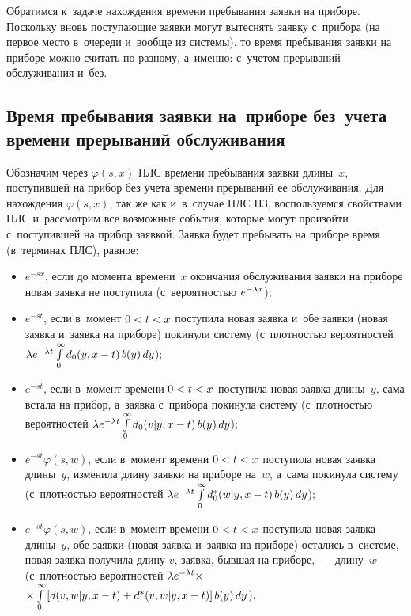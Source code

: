 \begin{multicols}{2}
Обратимся к~задаче нахождения времени пребывания заявки на приборе.
Поскольку вновь поступающие заявки могут вытеснять заявку с~прибора (на первое место в~очереди и~вообще из системы), то время пребывания заявки на приборе можно считать по-разному, а~именно: с~учетом прерываний обслуживания и~без.

\subsection{Время пребывания заявки на~приборе без~учета времени прерываний
обслуживания}

Обозначим через $\varphi(s,x)$ ПЛС времени пребывания заявки длины~$x$, поступившей на прибор без учета времени прерываний ее обслуживания.
Для нахождения $\varphi(s,x)$, так же как и~в~случае ПЛС ПЗ, воспользуемся
свойствами ПЛС и~рассмотрим все возможные события, которые могут произойти с~поступившей на прибор заявкой.
Заявка будет пребывать на приборе время (в~терминах ПЛС), равное:
\begin{itemize}
\item  $e^{-s x}$, если до момента времени~$x$
окончания обслуживания заявки на приборе новая заявка не поступила (с~вероятностью $e^{-\lambda x}$);

\item $e^{-s t}$, если в~момент $0\hm<t\hm<x$
поступила новая заявка и~обе заявки (новая заявка и~заявка на приборе) покинули
систему (с~плот\-ностью вероятностей $\la e^{-\la t}\int\limits_0^\infty d_0(y,x\hm-t)\,b(y)\,dy$);

\item  $e^{-s t}$, если в~момент времени
$0\hm<t\hm<x$ поступила новая заявка длины~$y$, сама встала на прибор, а~заявка с~прибора покинула систему (с~плот\-ностью вероятностей
$\la e^{-\la t} \int\limits_0^\infty d_0(v|y,x\hm-t)\, b(y)\, dy
$);

\item  $e^{-s t}\varphi(s,w)$, если в~момент времени
$0\hm<t\hm<x$ поступила новая заявка длины~$y$, изменила длину заявки на приборе на~$w$, а~сама покинула систему (с~плот\-ностью вероятностей
$\la e^{-\la t} \int\limits_0^\infty d^*_0(w|y,x\hm-t)\, b(y)\, dy
$);

\item  $e^{-s t}\varphi(s,w)$, если в~момент
времени $0\hm<t\hm<x$ поступила новая заявка длины~$y$, обе заявки (новая
заявка и~заявка на приборе) остались в~системе, новая заявка
получила длину $v$, заявка, бывшая на приборе,~--- длину~$w$ (с~плот\-ностью вероятностей $\lambda e^{-\lambda t} \times$ $\times\int\limits_0^\infty
\left[d(v,w|y,x-t)+d^*(v,w|y,x\hm-t)\right] b(y)\, dy $).
\end{itemize}


\end{multicols}
